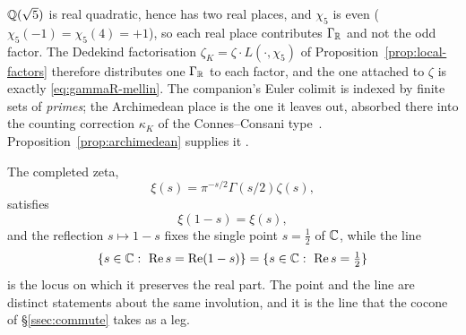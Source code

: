 \begin{remark}\label{rmk:places-F1}
$\mathbb{Q}(\sqrt5)$ is real quadratic, hence has two real places, and $\chi_5$ is even
($\chi_5(-1)=\chi_5(4)=+1$), so each real place contributes $\Gamma_{\mathbb{R}}$ and not the
odd factor. The Dedekind factorisation $\zeta_K=\zeta\cdot L(\cdot,\chi_5)$ of
Proposition~\ref{prop:local-factors} therefore distributes one $\Gamma_{\mathbb{R}}$ to each factor, and the one
attached to $\zeta$ is exactly \eqref{eq:gammaR-mellin}. The companion's Euler colimit
is indexed by finite sets of \emph{primes}; the Archimedean place is the one it leaves
out, absorbed there into the counting correction $\kappa_K$ of the Connes--Consani
type~\cite{ConnesConsaniSite}. Proposition~\ref{prop:archimedean} supplies it .
\end{remark}
\begin{theorem}\label{thm:funct-eq}
The completed zeta,
\[
  \xi(s)=\pi^{-s/2}\Gamma(s/2)\zeta(s),
\]
satisfies
\begin{equation}\label{eq:funct-eq}
  \xi(1-s)=\xi(s),
\end{equation}
and the reflection $s\mapsto 1-s$ fixes the single point $s=\tfrac12$ of $\mathbb{C}$, while the line
\begin{equation}\label{eq:selfdual-line}
  \{s\in\mathbb{C}:\ \operatorname{Re} s=\operatorname{Re}(1-s)\}=\{s\in\mathbb{C}:\ \operatorname{Re} s=\tfrac12\}
\end{equation}
is the locus on which it preserves the real part. The point and the line are distinct statements
about the same involution, and it is the line that the cocone of \S\ref{ssec:commute} takes as a
leg.

\end{theorem}
